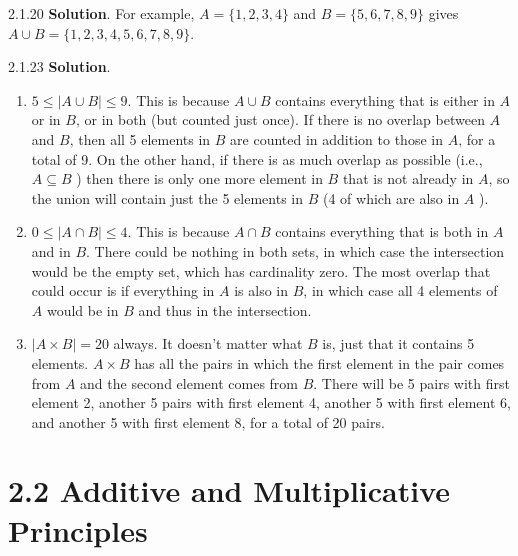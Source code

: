 \documentclass[11pt,]{book}
\theoremstyle{ptxplainnotitle}
\theoremstyle{ptxplaintitle}
\theoremstyle{ptxdefinitionnotitle}
\theoremstyle{ptxdefinitiontitle}
\theoremstyle{ptxdefinitionnotitle}
\theoremstyle{ptxdefinitiontitle}
\theoremstyle{ptxdefinitionnotitle}
\theoremstyle{ptxdefinitiontitle}
\theoremstyle{ptxdefinitiontitlenonumber}
\theoremstyle{ptxdefinitiontitlenonumber}
\numberwithin{equation}{chapter}
\begin{document}
\begin{divisionexercise}{2.1.20}
\textbf{Solution}.\quad%
\hypertarget{p-928}{}%
For example, \(A = \{1,2,3,4\}\) and \(B = \{5,6,7,8,9\}\) gives \(A \cup B = \{1,2,3,4,5,6,7,8,9\}\).%
\end{divisionexercise}%
\begin{divisionexercise}{2.1.23}
\textbf{Solution}.\quad%
\hypertarget{p-945}{}%
\leavevmode%
\begin{enumerate}[label=\alph*.]
\item\hypertarget{li-428}{}\hypertarget{p-946}{}%
\(5 \le |A\cup B| \le 9\text{.}\)  This is because \(A \cup B\) contains everything that is either in \(A\) or in \(B\text{,}\) or in both (but counted just once).  If there is no overlap between \(A\) and \(B\text{,}\) then all 5 elements in \(B\) are counted in addition to those in \(A\text{,}\) for a total of 9. On the other hand, if there is as much overlap as possible (i.e., \(A \subseteq B\) ) then there is only one more element in \(B\) that is not already in \(A\text{,}\) so the union will contain just the 5 elements in \(B\) (4 of which are also in \(A\) ).%
\item\hypertarget{li-429}{}\hypertarget{p-947}{}%
\(0 \le |A \cap B| \le 4\text{.}\)  This is because \(A \cap B\) contains everything that is both in \(A\) and in \(B\text{.}\)  There could be nothing in both sets, in which case the intersection would be the empty set, which has cardinality zero.  The most overlap that could occur is if everything in \(A\) is also in \(B\text{,}\) in which case all 4 elements of \(A\) would be in \(B\) and thus in the intersection.%
\item\hypertarget{li-430}{}\hypertarget{p-948}{}%
\(|A \times B| = 20\) always.  It doesn't matter what \(B\) is, just that it contains 5 elements. \(A \times B\) has all the pairs in which the first element in the pair comes from \(A\) and the second element comes from \(B\text{.}\)  There will be 5 pairs with first element 2, another 5 pairs with first element 4, another 5 with first element 6, and another 5 with first element 8, for a total of 20 pairs.%
\end{enumerate}
%
\end{divisionexercise}%
\section*{2.2 Additive and Multiplicative Principles}
\end{document}
